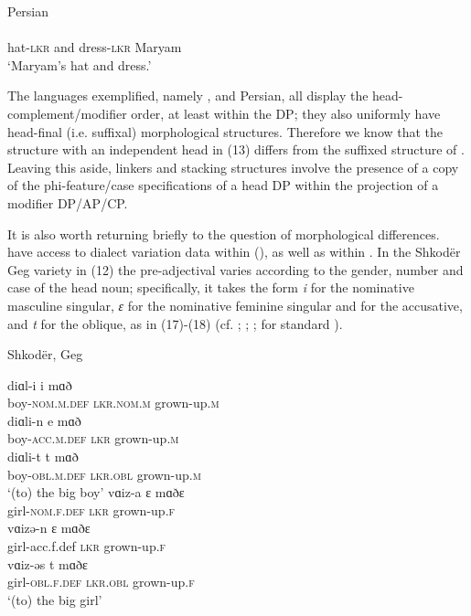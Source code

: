 \documentclass[output=paper]{langsci/langscibook}
\begin{document}
\ea%
         Persian \citep[38]{Philip2012}\label{ex:manzini:16}\\
    \gll{} \\
          hat-\textsc{lkr}   and   dress-\textsc{lkr}   Maryam\\
    \glt  ‘Maryam’s hat and dress.’ 
\z
                    
The languages exemplified, namely ,  and Persian, all display the head-complement\slash modifier order, at least within the DP; they also uniformly have head-final (i.e. suffixal) morphological structures. Therefore we know that the  structure with an independent head in (13) differs from the suffixed structure of . Leaving this aside, linkers and stacking structures involve the presence of a copy of the phi-feature\slash case specifications of a head DP within the projection of a modifier DP\slash AP\slash CP.   

It is also worth returning briefly to the question of morphological differences. \citet{Franco2015} have access to dialect variation data within  (\citealt{Manzini2011Grammatical,Manzini2011Reducing}), as well as within . In the Shkodër Geg  variety in (12) the pre-ad\-jec\-ti\-val  varies according to the gender, number and case of the head noun; specifically, it takes the form \textit{i} for the nominative masculine singular, \textit{ɛ} for the nominative feminine singular and for the accusative, and \textit{t} for the oblique, as in (17)-(18) (cf. \citealt{Solano1972}; \citealt{Camaj1984}; \citealt{Turano2004}; \citealt{Campos2008} for standard ).

\ea%
    Shkodër, Geg \label{ex:manzini:17}\\
    \begin{xlista}
    \ex
    \gll diɑl-i      i     mɑð           \\
         boy-\textsc{nom.m.def}   \textsc{lkr.nom.m}  grown-up.\textsc{m}\\
    \ex
    \gll diɑli-n     e     mɑð    \\
         boy-\textsc{acc.m.def}     \textsc{lkr}    grown-up.\textsc{m}\\
    \ex
    \gll diɑli-t              t     mɑð  \\
         boy-\textsc{obl.m.def}  \textsc{lkr.obl}  grown-up.\textsc{m}\\
    \glt ‘(to) the big boy’
    \gll vɑiz-a     ɛ     mɑðɛ    \\
         girl-\textsc{nom.f.def}   \textsc{lkr}    grown-up.\textsc{f} \\
    \gll vɑizə-n     ɛ     mɑðɛ    \\
         girl-acc.f.def    \textsc{lkr}    grown-up.\textsc{f}\\
    \gll vɑiz-əs    t     mɑðɛ \\
         girl-\textsc{obl.f.def}    \textsc{lkr.obl}  grown-up.\textsc{f}\\
    \glt ‘(to) the big girl’
    \end{xlista}
\z
\end{document}
